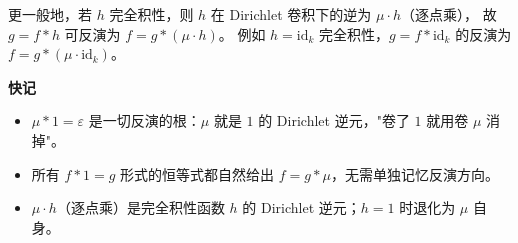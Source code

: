 更一般地，若 $h$ 完全积性，则 $h$ 在 Dirichlet 卷积下的逆为 $\mu\cdot h$（逐点乘），
故 $g = f * h$ 可反演为 $f = g * (\mu\cdot h)$。
例如 $h=\text{id}_k$ 完全积性，$g = f * \text{id}_k$ 的反演为 $f = g * (\mu\cdot\text{id}_k)$。

\textbf{快记}
\begin{itemize}
\item $\mu * 1 = \varepsilon$ 是一切反演的根：$\mu$ 就是 $1$ 的 Dirichlet 逆元，"卷了 $1$ 就用卷 $\mu$ 消掉"。
\item 所有 $f * 1 = g$ 形式的恒等式都自然给出 $f = g * \mu$，无需单独记忆反演方向。
\item $\mu\cdot h$（逐点乘）是完全积性函数 $h$ 的 Dirichlet 逆元；$h=1$ 时退化为 $\mu$ 自身。
\end{itemize}
